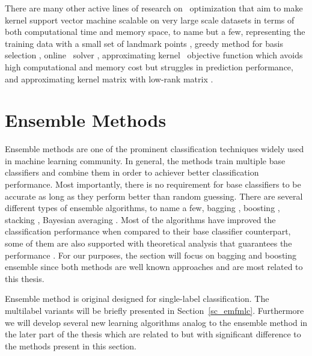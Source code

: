 {There are many other active lines of research on \svm\ optimization that aim to make kernel support vector machine scalable on very large scale datasets in terms of both computational time and memory space, to name but a few, representing the training data with a small set of landmark points \citep{Pavlov00towards,Boley04training,Yu05making,Zhang08improved}, greedy method for basis selection \citep{Keerthi06building}, online \svm\ solver \citep{Bordes05fast}, approximating kernel \svm\ objective function \citep{Zhang12scaling, Le13fast} which avoids high computational and memory cost but struggles in prediction performance, and approximating kernel matrix with low-rank matrix \citep{Smola00sparse,Fine02efficient,Drineas05on,Si14memory}.



%
%
%
\section{Ensemble Methods} \label{sc_em}

Ensemble methods are one of the prominent classification techniques widely used in machine learning community.
In general, the methods train multiple base classifiers and combine them in order to achiever better classification performance.
Most importantly, there is no requirement for base classifiers to be accurate as long as they perform better than random guessing.
There are several different types of ensemble algorithms, to name a few, bagging \citep{Breiman96bagging}, boosting \citep{Freund97a,Schapire99improved}, stacking \citep{Smyth99linearly}, Bayesian averaging \citep{Freund04generalization}.
Most of the algorithms have improved the classification performance when compared to their base classifier counterpart, some of them are also supported with theoretical analysis that guarantees the performance \citep{Schapire97boosting,Koltchinskii00empirical,Cortes14semble,Cortes14deep}.
For our purposes, the section will focus on bagging and boosting ensemble since both methods are well known approaches and are most related to this thesis.

Ensemble method is original designed for single-label classification.
The multilabel variants will be briefly presented in Section~\ref{sc_emfmlc}.
Furthermore we will develop several new learning algorithms analog to the ensemble method in the later part of the thesis which are related to but with significant difference to the methods present in this section.



}
